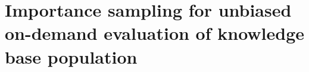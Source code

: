 \chapter{Importance sampling for unbiased on-demand evaluation of knowledge base population}













%
%

%
%
